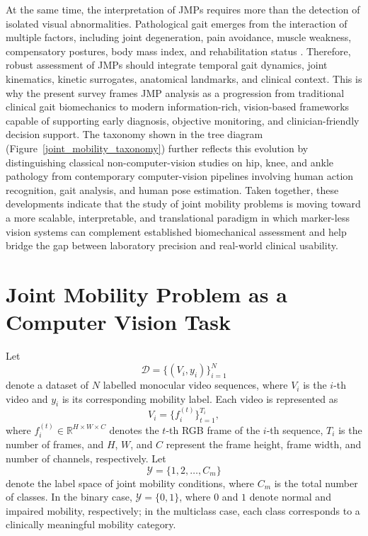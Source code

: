 \documentclass[12pt,nopreprintline]{elsarticle}
\begin{document}
At the same time, the interpretation of JMPs requires more than the detection of isolated visual abnormalities. Pathological gait emerges from the interaction of multiple factors, including joint degeneration, pain avoidance, muscle weakness, compensatory postures, body mass index, and rehabilitation status \cite{harding2012body,gaudreault2011effects,butler2009gait,phinyomark2016gender}. Therefore, robust assessment of JMPs should integrate temporal gait dynamics, joint kinematics, kinetic surrogates, anatomical landmarks, and clinical context. This is why the present survey frames JMP analysis as a progression from traditional clinical gait biomechanics to modern information-rich, vision-based frameworks capable of supporting early diagnosis, objective monitoring, and clinician-friendly decision support. The taxonomy shown in the tree diagram (Figure~\ref{joint_mobility_taxonomy}) further reflects this evolution by distinguishing classical non-computer-vision studies on hip, knee, and ankle pathology from contemporary computer-vision pipelines involving human action recognition, gait analysis, and human pose estimation. Taken together, these developments indicate that the study of joint mobility problems is moving toward a more scalable, interpretable, and translational paradigm in which marker-less vision systems can complement established biomechanical assessment and help bridge the gap between laboratory precision and real-world clinical usability.



\section{Joint Mobility Problem as a Computer Vision Task}
\label{sec:JMPCV}

Let
\[
\mathcal{D}=\{(V_i,y_i)\}_{i=1}^{N}
\]
denote a dataset of \(N\) labelled monocular video sequences, where \(V_i\) is the \(i\)-th video and \(y_i\) is its corresponding mobility label. Each video is represented as
\[
V_i=\{f_i^{(t)}\}_{t=1}^{T_i},
\]
where \(f_i^{(t)} \in \mathbb{R}^{H \times W \times C}\) denotes the \(t\)-th RGB frame of the \(i\)-th sequence, \(T_i\) is the number of frames, and \(H\), \(W\), and \(C\) represent the frame height, frame width, and number of channels, respectively. Let
\[
\mathcal{Y}=\{1,2,\ldots,C_m\}
\]
denote the label space of joint mobility conditions, where \(C_m\) is the total number of classes. In the binary case, \(\mathcal{Y}=\{0,1\}\), where \(0\) and \(1\) denote normal and impaired mobility, respectively; in the multiclass case, each class corresponds to a clinically meaningful mobility category.
\end{document}
